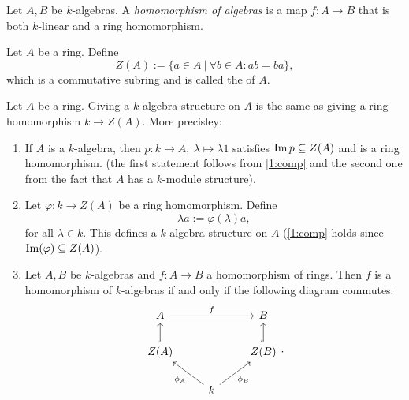\begin{defn}
	Let $A,B$ be $k$-algebras. A \emph{homomorphism of algebras} is a map $f:A\to B$ that is both $k$-linear and a ring homomorphism.
\end{defn}
\begin{rem}
	Let $A$ be a ring. Define
	\[
		Z(A):= \{a\in A~|~\forall b\in A: ab=ba\},
	\]
	which is a commutative subring and is called the  of $A$.
\end{rem}
\begin{rem}
	Let $A$ be a ring. Giving a $k$-algebra structure on $A$ is the same as giving a ring homomorphism $k\to Z(A)$. More precisley:
	\begin{enumerate}
		\item If $A$ is a $k$-algebra, then $p:k\to A,~\lambda\mapsto \lambda 1$ satisfies $\operatorname{Im} p\subseteq Z(A)$ and is a ring homomorphism. (the first statement follows from \eqref{1:comp} and the second one from the fact that $A$ has a $k$-module structure).
		 \item Let $\varphi:k\to Z(A)$ be a ring homomorphism. Define
		 \[
		 \lambda a:= \varphi(\lambda)a,
			\]
		for all $\lambda \in k$. This defines a $k$-algebra structure on $A$ (\eqref{1:comp} holds since $\operatorname{Im}(\varphi)\subseteq Z(A)$).
		\item Let $A,B$ be $k$-algebras and $f:A\to B$ a homomorphism of rings. Then $f$ is a homomorphism of $k$-algebras if and only if the following diagram commutes:
		\[
		\begin{tikzcd}
			A\ar{rr}{f}&&B\\
			Z(A)\ar[hookrightarrow]{u}&&\ar[hookrightarrow]{u}Z(B)\\
			&k\ar{ul}{\phi_A}\ar[swap]{ur}{\phi_B}&
		\end{tikzcd}.
		\]
	\end{enumerate}
\end{rem}
